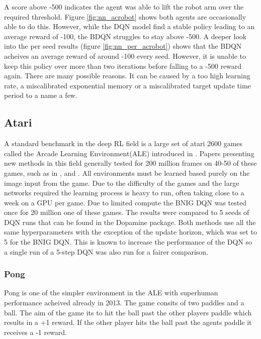 A score above -500 indicates the agent was able to lift the robot arm over the required threshold. Figure \ref{fig:nn_acrobot} shows both agents are occasionally able to do this. However, while the DQN model find a stable policy leading to an average reward of -100, the BDQN struggles to stay above -500. A deeper look into the per seed results (figure \ref{fig:nn_per_acrobot}) shows that the BDQN acheives an average reward of around -100 every seed. However, it is unable to keep this policy over more than two iterations before falling to a -500 reward again. There are many possible reasons. It can be caused by a too high learning rate, a miscalibrated exponential memory or a miscalibrated target update time period to a name a few.

\subsection{Atari}

A standard benchmark in the deep RL field is a large set of atari 2600 games called the Arcade Learning Environment(ALE) introduced in \cite{bellemare_2013}. Papers presenting new methods in this field generally tested for 200 million frames on 40-50 of these games, such as in \cite{mnih_2015}, \cite{mnih_2016} and \cite{donoghue_2017}. All environments must be learned based purely on the image input from the game. Due to the difficulty of the games and the large networks required the learning process is heavy to run, often taking close to a week on a GPU per game. Due to limited compute the BNIG DQN was tested once for 20 million one of these games. The results were compared to 5 seeds of DQN runs that can be found in the Dopamine package. Both methods use all the same hyperparameters with the exception of the update horizon, which was set to 5 for the BNIG DQN. This is known to increase the performance of the DQN so a single run of a 5-step DQN was also run for a fairer comparison.

\subsubsection{Pong}

Pong is one of the simpler environment in the ALE with superhuman performance acheived already in 2013\citep{mnih_2013}. The game consits of two paddles and a ball. The aim of the game its to hit the ball past the other players paddle which results in a +1 reward. If the other player hits the ball past the agents paddle it receives a -1 reward. 

